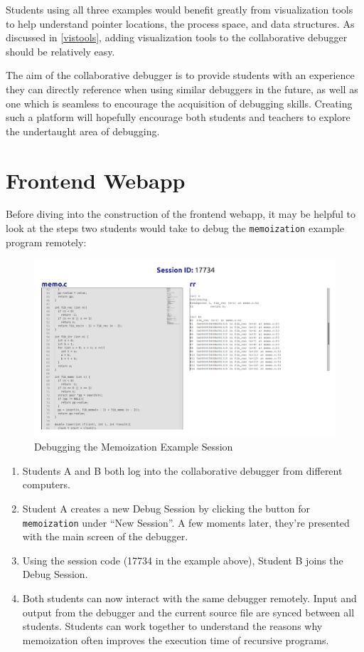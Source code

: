 \documentclass[12pt]{article}
\begin{document}
Students using all three examples would benefit greatly from
visualization tools to help understand pointer locations, the process
space, and data structures.  As discussed in \ref{vistools}, adding
visualization tools to the collaborative debugger should be relatively
easy.
\par 

The aim of the collaborative debugger is to provide students with an
experience they can directly reference when using similar debuggers in
the future, as well as one which is seamless to encourage the
acquisition of debugging skills.  Creating such a platform will
hopefully encourage both students and teachers to explore the
undertaught area of debugging.

\section{Frontend Webapp}\label{webapp}

Before diving into the construction of the frontend webapp, it may be
helpful to look at the steps two students would take to debug the
\lstinline{memoization} example program remotely:

\begin{figure}[h!]

  \includegraphics[width=\textwidth]{memoization}
  \centering
  \caption{Debugging the Memoization Example Session}
  \label{frontend:rrterm}
\end{figure}

\begin{enumerate}
\item Students A and B both log into the collaborative debugger from
  different computers.
\item Student A creates a new Debug Session by clicking the button for
  \lstinline{memoization} under ``New Session''.  A few moments later,
  they're presented with the main screen of the debugger.
\item Using the session code (17734 in the example above), Student B
  joins the Debug Session.
\item Both students can now interact with the same debugger remotely.
  Input and output from the debugger and the current source file are
  synced between all students.  Students can work together to
  understand the reasons why memoization often improves the execution
  time of recursive programs.
\end{enumerate}
\end{document}
